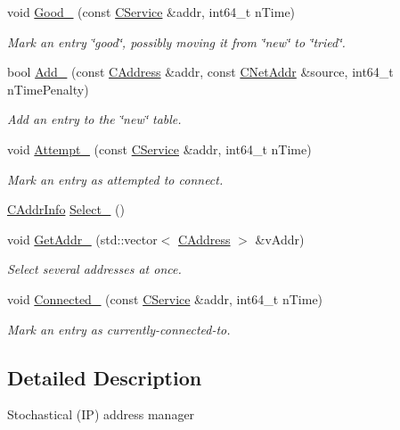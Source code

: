\begin{DoxyCompactItemize}
void \hyperlink{class_c_addr_man_a33ec6a4584cf4b17af821e6e35216459}{Good\+\_\+} (const \hyperlink{class_c_service}{C\+Service} \&addr, int64\+\_\+t n\+Time)
\begin{DoxyCompactList}\small\item\em Mark an entry \char`\"{}good\char`\"{}, possibly moving it from \char`\"{}new\char`\"{} to \char`\"{}tried\char`\"{}. \end{DoxyCompactList}\item 
bool \hyperlink{class_c_addr_man_a9dd6df8b1904548a86054d19d4a90724}{Add\+\_\+} (const \hyperlink{class_c_address}{C\+Address} \&addr, const \hyperlink{class_c_net_addr}{C\+Net\+Addr} \&source, int64\+\_\+t n\+Time\+Penalty)
\begin{DoxyCompactList}\small\item\em Add an entry to the \char`\"{}new\char`\"{} table. \end{DoxyCompactList}\item 
void \hyperlink{class_c_addr_man_ab1a1bfa8b435ef139570c88de1a5245f}{Attempt\+\_\+} (const \hyperlink{class_c_service}{C\+Service} \&addr, int64\+\_\+t n\+Time)
\begin{DoxyCompactList}\small\item\em Mark an entry as attempted to connect. \end{DoxyCompactList}\item 
\hyperlink{class_c_addr_info}{C\+Addr\+Info} \hyperlink{class_c_addr_man_ad354e94672ff88f8f420ebc2e05f21a6}{Select\+\_\+} ()
\item 
void \hyperlink{class_c_addr_man_aff86d04dc7c0e0afae3ff5998417db17}{Get\+Addr\+\_\+} (std\+::vector$<$ \hyperlink{class_c_address}{C\+Address} $>$ \&v\+Addr)
\begin{DoxyCompactList}\small\item\em Select several addresses at once. \end{DoxyCompactList}\item 
void \hyperlink{class_c_addr_man_a1ae72643c51293f3f3345e74ce0368ca}{Connected\+\_\+} (const \hyperlink{class_c_service}{C\+Service} \&addr, int64\+\_\+t n\+Time)
\begin{DoxyCompactList}\small\item\em Mark an entry as currently-\/connected-\/to. \end{DoxyCompactList}\end{DoxyCompactItemize}


\subsection{Detailed Description}
Stochastical (I\+P) address manager 

